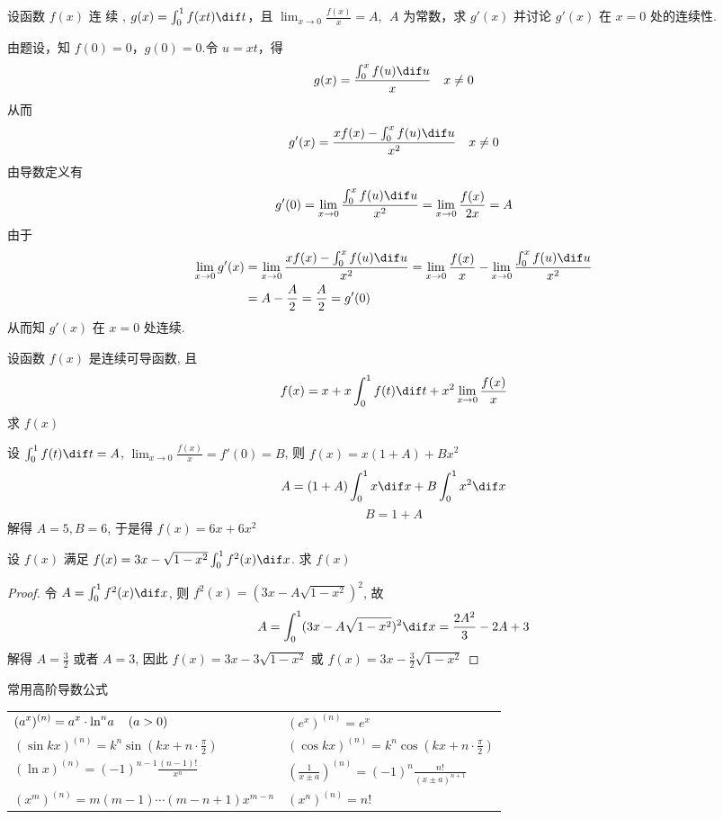 \documentclass[color=green,titlestyle=hang]{elegantbook}%
\begin{document}
\begin{example}
设函数 $f(x)$ 连 续 , $g(x)=\int_0^1f(xt)\dif t$，且 $\lim_{x\to0}\frac{f(x)}{x}=A$, $\;A$ 为常数，求 $g'(x)$ 并讨论 $g'(x)$ 在 $x=0$ 处的连续性.
\end{example}
\begin{solution}
由题设，知 $f(0)=0$，$g(0)=0$.令 $u=xt$，得\[g(x)=\frac{\int_0^xf(u)\dif u}{x}\quad x\neq0\]
从而\[g'(x)=\frac{xf(x)-\int_0^xf(u)\dif u}{x^2}\quad x\neq0\]
由导数定义有\[g'(0)=\lim\limits_{x\to0}\frac{\int_0^xf(u)\dif u}{x^2}=\lim_{x\to0}\frac{f(x)}{2x}=A\]
由于 \begin{align*}
\lim_{x\to0}g'(x)&=\lim_{x\to0}\frac{xf(x)-\int_0^xf(u)\dif u}{x^2}=\lim_{x\to0}\frac{f(x)}{x}-\lim_{x\to0}\frac{\int_0^xf(u)\dif u}{x^2}\\
&=A-\frac{A}{2}=\frac{A}{2}=g'(0)
\end{align*}
从而知 $g'(x)$ 在 $x=0$ 处连续.	
\end{solution}

\begin{example}
设函数 $f(x)$ 是连续可导函数, 且
\[f(x)=x+x\int_0^1f(t)\dif t+x^2\lim_{x\to0}\frac{f(x)}{x} \]
求 $f(x)$
\end{example}\begin{solution}
设 $\int_0^1f(t)\dif t=A$, $\lim_{x\to0}\frac{f(x)}{x}=f'(0)=B$, 则 $f(x)=x(1+A)+Bx^2$
\[A=(1+A)\int_0^1x\dif x+B\int_0^1x^2\dif x \]
\[B=1+A\]
解得 $A=5,B=6$, 于是得 $f(x)=6x+6x^2$
\end{solution}

\begin{example}
设 $f(x)$ 满足 $f(x)=3x-\sqrt{1-x^2}\int_0^1f^2(x)\dif x$. 求 $f(x)$
\end{example}\begin{proof}
令 $A=\int_0^1f^2(x)\dif x$, 则 $f^2(x)=(3x-A\sqrt{1-x^2})^2$, 故
\[A=\int_0^1(3x-A\sqrt{1-x^2})^2\dif x=\frac{2A^2}{3}-2A+3\]
解得 $A=\frac{3}{2}$ 或者 $A=3$, 因此 $f(x)=3x-3\sqrt{1-x^2}$ 或 $f(x)=3x-\frac{3}{2}\sqrt{1-x^2}$	
\end{proof}

\begin{theorem}{常用高阶导数公式}{}
\begin{tabularx}{\textwidth}{ll}
$\displaystyle{({a^x})^{(n)}}={a^x} \cdot {\ln ^n}a\hspace{4mm}(a>0)$&$\displaystyle(e^x)^{(n)}=e^x$\\
$\displaystyle{(\sin kx)^{(n)}}={k^n}\sin \left( {kx + n \cdot \frac{\pi }{2}} \right)$ &$\displaystyle
{(\cos kx)^{(n)}}={k^n}\cos \left( {kx + n \cdot \frac{\pi }{2}} \right)$\\
$\displaystyle{(\ln x)^{(n)}} ={( - 1)^{n - 1}}\frac{{(n - 1)!}}{{{x^n}}}$& $\displaystyle{\left( {\frac{1}{{x \pm a}}} \right)^{(n)}} = {( - 1)^n}\frac{{n!}}{{{{(x \pm a)}^{n + 1}}}}$\\
$\displaystyle(x^m)^{(n)}=m(m-1)\cdots(m-n+1)x^{m-n}$&$\displaystyle(x^n)^{(n)}=n!$	
\end{tabularx}
\end{theorem}
\end{document}

